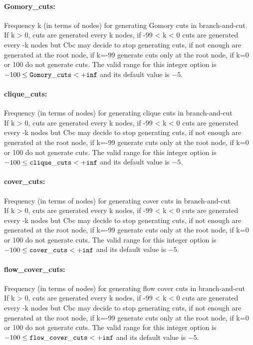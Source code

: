 \paragraph{Gomory\_cuts:}\label{sec:Gomory_cuts} Frequency k (in terms of nodes) for generating Gomory cuts in branch-and-cut. $\;$ \\
 If k > 0, cuts are generated every k nodes, if
-99 < k < 0 cuts are generated every -k nodes but
Cbc may decide to stop generating cuts, if not
enough are generated at the root node, if k=-99
generate cuts only at the root node, if k=0 or
100 do not generate cuts. The valid range for this integer option is
$-100 \le {\tt Gomory\_cuts } <  {\tt +inf}$
and its default value is $-5$.


\paragraph{clique\_cuts:}\label{sec:clique_cuts} Frequency (in terms of nodes) for generating clique cuts in branch-and-cut $\;$ \\
 If k > 0, cuts are generated every k nodes, if
-99 < k < 0 cuts are generated every -k nodes but
Cbc may decide to stop generating cuts, if not
enough are generated at the root node, if k=-99
generate cuts only at the root node, if k=0 or
100 do not generate cuts. The valid range for this integer option is
$-100 \le {\tt clique\_cuts } <  {\tt +inf}$
and its default value is $-5$.


\paragraph{cover\_cuts:}\label{sec:cover_cuts} Frequency (in terms of nodes) for generating cover cuts in branch-and-cut $\;$ \\
 If k > 0, cuts are generated every k nodes, if
-99 < k < 0 cuts are generated every -k nodes but
Cbc may decide to stop generating cuts, if not
enough are generated at the root node, if k=-99
generate cuts only at the root node, if k=0 or
100 do not generate cuts. The valid range for this integer option is
$-100 \le {\tt cover\_cuts } <  {\tt +inf}$
and its default value is $-5$.


\paragraph{flow\_cover\_cuts:}\label{sec:flow_cover_cuts} Frequency (in terms of nodes) for generating flow cover cuts in branch-and-cut $\;$ \\
 If k > 0, cuts are generated every k nodes, if
-99 < k < 0 cuts are generated every -k nodes but
Cbc may decide to stop generating cuts, if not
enough are generated at the root node, if k=-99
generate cuts only at the root node, if k=0 or
100 do not generate cuts. The valid range for this integer option is
$-100 \le {\tt flow\_cover\_cuts } <  {\tt +inf}$
and its default value is $-5$.


